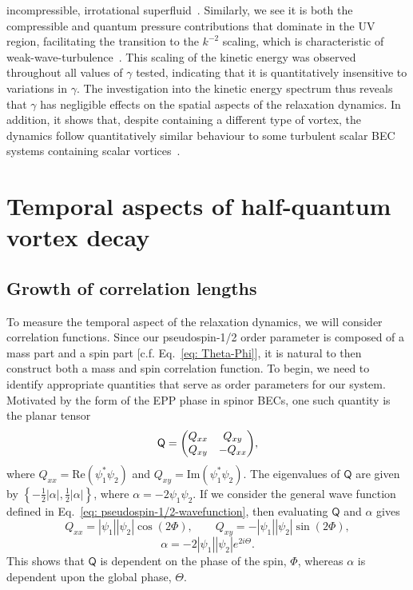 incompressible, irrotational superfluid~\cite{Pethick2008,Barenghi2016}.
Similarly, we see it is both the compressible and quantum pressure contributions
that dominate in the UV region, facilitating the transition to the \(k^{-2}\)
scaling, which is characteristic of weak-wave-turbulence~\cite{Zakharov1992,
Nazarenko2011, Newell2011}.
This scaling of the kinetic energy was observed throughout all values of
\(\gamma \) tested, indicating that it is quantitatively insensitive to
variations in \(\gamma \).
The investigation into the kinetic energy spectrum thus reveals that \(\gamma \)
has negligible effects on the spatial aspects of the relaxation dynamics.
In addition, it shows that, despite containing a different type of vortex, the
dynamics follow quantitatively similar behaviour to some turbulent scalar BEC
systems containing scalar vortices~\cite{Nowak2012}.

\section{Temporal aspects of half-quantum vortex decay}
\subsection{Growth of correlation lengths}
To measure the temporal aspect of the relaxation dynamics, we will consider
correlation functions.
Since our pseudospin-1/2 order parameter is composed of a mass part and a spin
part [c.f. Eq.~\eqref{eq: Theta-Phi}], it is natural to then construct both a
mass and spin correlation function.
To begin, we need to identify appropriate quantities that serve as order
parameters for our system.
Motivated by the form of the EPP phase in spinor BECs, one such quantity is
the planar tensor~\cite{Symes2017}
\begin{equation}
    \mathsf{Q} = \mqty(Q_{xx} & Q_{xy} \\ Q_{xy} & -Q_{xx}),
\end{equation}
where \(Q_{xx} = \mathrm{Re}(\psi_1^*\psi_2)\) and
\(Q_{xy} = \mathrm{Im}(\psi_1^*\psi_2)\).
The eigenvalues of \(\mathsf{Q}\) are given by
\( \left\{-\frac{1}{2}|\alpha|, \frac{1}{2}|\alpha|\right\} \), where
\(\alpha=-2\psi_1\psi_2\).
If we consider the general wave function defined in
Eq.~\eqref{eq: pseudospin-1/2-wavefunction}, then evaluating \(\mathsf{Q}\) and
\(\alpha \) gives
\begin{equation}
    Q_{xx} = |\psi_1||\psi_2|\cos({2\Phi}), \qquad
    Q_{xy} = -|\psi_1||\psi_2|\sin({2\Phi}),
\end{equation}
\begin{equation}
    \alpha = -2|\psi_1||\psi_2|e^{2i\Theta}.
\end{equation}
This shows that \(\mathsf{Q}\) is dependent on the phase of the spin,
\( \Phi \), whereas \(\alpha \) is dependent upon the global phase,
\( \Theta \).

